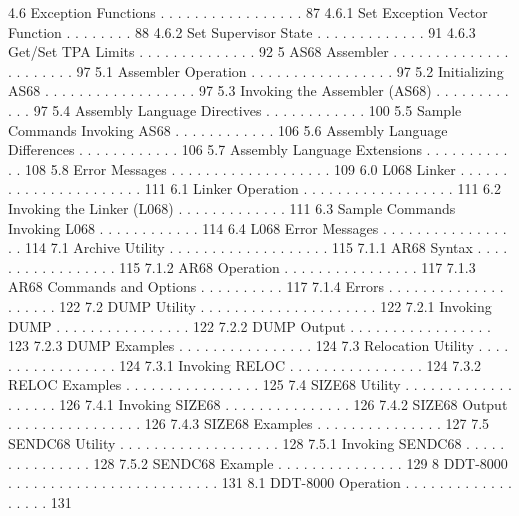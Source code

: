    4.6  Exception Functions . . . . . . . . . . . . . . . . .  87 
        4.6.1  Set Exception Vector Function  . . . . . . . .  88 
        4.6.2  Set Supervisor State . . . . . . . . . . . . .  91 
        4.6.3  Get/Set TPA Limits . . . . . . . . . . . . . .  92 
5  AS68 Assembler . . . . . . . . . . . . . . . . . . . . . .  97 
   5.1  Assembler Operation . . . . . . . . . . . . . . . . .  97 
   5.2  Initializing AS68 . . . . . . . . . . . . . . . . . .  97 
   5.3  Invoking the Assembler (AS68) . . . . . . . . . . . .  97 
   5.4  Assembly Language Directives  . . . . . . . . . . . . 100 
   5.5  Sample Commands Invoking AS68 . . . . . . . . . . . . 106 
   5.6  Assembly Language Differences . . . . . . . . . . . . 106 
   5.7  Assembly Language Extensions  . . . . . . . . . . . . 108 
   5.8  Error Messages  . . . . . . . . . . . . . . . . . . . 109 
6.0  L068 Linker  . . . . . . . . . . . . . . . . . . . . . . 111 
   6.1  Linker Operation  . . . . . . . . . . . . . . . . . . 111 
   6.2  Invoking the Linker (L068)  . . . . . . . . . . . . . 111 
   6.3  Sample Commands Invoking L068 . . . . . . . . . . . . 114 
   6.4  L068 Error Messages . . . . . . . . . . . . . . . . . 114 
   7.1  Archive Utility . . . . . . . . . . . . . . . . . . . 115 
        7.1.1  AR68 Syntax  . . . . . . . . . . . . . . . . . 115 
        7.1.2  AR68 Operation . . . . . . . . . . . . . . . . 117 
        7.1.3  AR68 Commands and Options  . . . . . . . . . . 117 
        7.1.4  Errors . . . . . . . . . . . . . . . . . . . . 122 
   7.2 DUMP Utility . . . . . . . . . . . . . . . . . . . . . 122 
        7.2.1  Invoking DUMP  . . . . . . . . . . . . . . . . 122 
        7.2.2  DUMP Output  . . . . . . . . . . . . . . . . . 123 
        7.2.3  DUMP Examples  . . . . . . . . . . . . . . . . 124 
   7.3  Relocation Utility  . . . . . . . . . . . . . . . . . 124 
        7.3.1  Invoking RELOC . . . . . . . . . . . . . . . . 124 
        7.3.2  RELOC Examples . . . . . . . . . . . . . . . . 125 
   7.4  SIZE68 Utility  . . . . . . . . . . . . . . . . . . . 126 
        7.4.1  Invoking SIZE68  . . . . . . . . . . . . . . . 126 
        7.4.2  SIZE68 Output  . . . . . . . . . . . . . . . . 126 
        7.4.3  SIZE68 Examples  . . . . . . . . . . . . . . . 127 
   7.5  SENDC68 Utility . . . . . . . . . . . . . . . . . . . 128 
        7.5.1  Invoking SENDC68 . . . . . . . . . . . . . . . 128 
        7.5.2  SENDC68 Example  . . . . . . . . . . . . . . . 129 
8  DDT-8000  . . . . . . . . . . . . . . . . . . . . . . . . . 131 
   8.1  DDT-8000 Operation . . . . . . . . . . . . . . . . . . 131 
